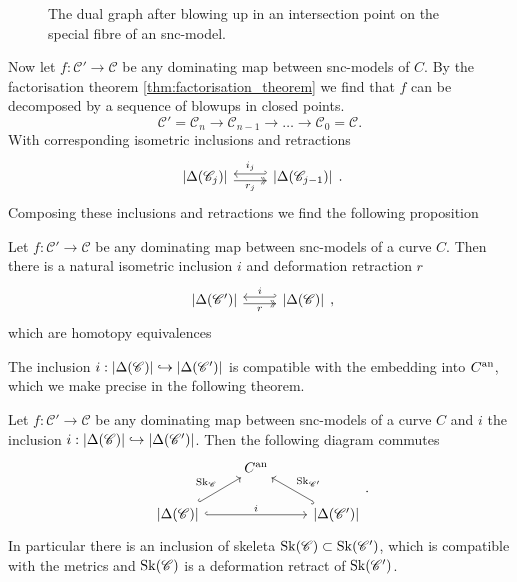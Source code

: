 \begin{figure}[ht]
    \centering
    \caption{The dual graph after blowing up in an intersection point on the special fibre of an snc-model. }
    \label{fig:blowup_intersection_points_skeleton}
\end{figure}

Now let $f:\mathscr C' \to \mathscr C$ be any dominating map between snc-models of $C$. 
By the factorisation theorem \cref{thm:factorisation_theorem} we find that $f$ can be decomposed by a sequence of blowups in closed points. 
\[
\mathscr C' = \mathscr C_n \to \mathscr C_{n-1} \to \ldots \to \mathscr C_0 = \mathscr C
.\] 
With corresponding isometric inclusions and retractions 
\[
\begin{tikzcd}
	{|\Delta(\mathscr C_{j})|} \rar[hookleftarrow, shift left]{i_j} \rar[twoheadrightarrow, shift right, ']{r_j} & {|\Delta(\mathscr C_{j-1})|} 
\end{tikzcd}
.\] 
Composing these inclusions and retractions we find the following proposition
\begin{proposition}\label{prop:inclusion_retraction_dual_graph}
	Let $f:\mathscr C' \to \mathscr C$ be any dominating map between snc-models of a curve $C$. 
	Then there is a natural isometric inclusion $i$ and deformation retraction $r$
\[
\begin{tikzcd}
	{|\Delta(\mathscr C')|} \rar[hookleftarrow, shift left]{i} \rar[twoheadrightarrow, shift right, ']{r} & {|\Delta(\mathscr C)|} 
\end{tikzcd}
,\] 
	which are homotopy equivalences
\end{proposition}

The inclusion $i: |\Delta(\mathscr C)| \hookrightarrow |\Delta(\mathscr C')|$ is compatible with the embedding into $C{}^{\text{an}}$, which we make precise in the following theorem. 
\begin{proposition}
	Let $f:\mathscr C' \to \mathscr C$ be any dominating map between snc-models of a curve $C$ and $i$ the inclusion $i: |\Delta(\mathscr C)| \hookrightarrow |\Delta(\mathscr C')|$. 
	Then the following diagram commutes \[
	\begin{tikzcd}
		& C\an \\
		{|\Delta(\mathscr C)|} \ar[hookrightarrow]{ur}{\sk_{\mathscr C}}
\ar[hookrightarrow]{rr}{i} & & {|\Delta(\mathscr C')|} \ar[hookrightarrow]{ul}[']{\sk_{\mathscr C'}}
	\end{tikzcd}
	.\] 
	In particular there is an inclusion of skeleta $\operatorname{Sk}(\mathscr C) \subset  \operatorname{Sk}(\mathscr C')$, which is compatible with the metrics and $\operatorname{Sk}(\mathscr C)$ is a deformation retract of  $\operatorname{Sk}(\mathscr C')$. 
\end{proposition}

